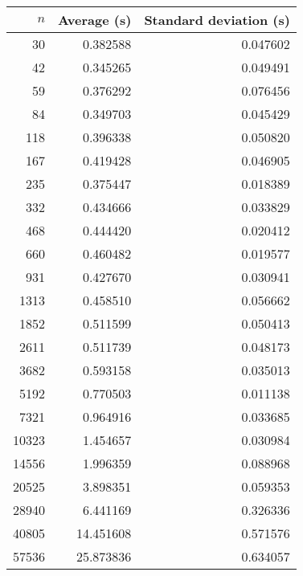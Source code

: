 \begin{tabular}{rrr}
$n$ & Average (s) & Standard deviation (s)\\\hline
30 & 0.382588 & 0.047602\\
42 & 0.345265 & 0.049491\\
59 & 0.376292 & 0.076456\\
84 & 0.349703 & 0.045429\\
118 & 0.396338 & 0.050820\\
167 & 0.419428 & 0.046905\\
235 & 0.375447 & 0.018389\\
332 & 0.434666 & 0.033829\\
468 & 0.444420 & 0.020412\\
660 & 0.460482 & 0.019577\\
931 & 0.427670 & 0.030941\\
1313 & 0.458510 & 0.056662\\
1852 & 0.511599 & 0.050413\\
2611 & 0.511739 & 0.048173\\
3682 & 0.593158 & 0.035013\\
5192 & 0.770503 & 0.011138\\
7321 & 0.964916 & 0.033685\\
10323 & 1.454657 & 0.030984\\
14556 & 1.996359 & 0.088968\\
20525 & 3.898351 & 0.059353\\
28940 & 6.441169 & 0.326336\\
40805 & 14.451608 & 0.571576\\
57536 & 25.873836 & 0.634057\\
\end{tabular}
